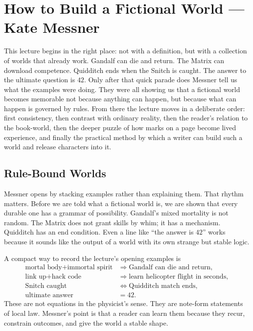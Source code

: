\chapter{How to Build a Fictional World --- Kate Messner}

This lecture begins in the right place: not with a definition, but with a collection of worlds that already work. Gandalf can die and return. The Matrix can download competence. Quidditch ends when the Snitch is caught. The answer to the ultimate question is \(42\). Only after that quick parade does Messner tell us what the examples were doing. They were all showing us that a fictional world becomes memorable not because anything can happen, but because what can happen is governed by rules. From there the lecture moves in a deliberate order: first consistency, then contrast with ordinary reality, then the reader's relation to the book-world, then the deeper puzzle of how marks on a page become lived experience, and finally the practical method by which a writer can build such a world and release characters into it.

\section{Rule-Bound Worlds}

Messner opens by stacking examples rather than explaining them. That rhythm matters. Before we are told what a fictional world is, we are shown that every durable one has a grammar of possibility. Gandalf's mixed mortality is not random. The Matrix does not grant skills by whim; it has a mechanism. Quidditch has an end condition. Even a line like ``the answer is \(42\)'' works because it sounds like the output of a world with its own strange but stable logic.

A compact way to record the lecture's opening examples is
\begin{align}
\text{mortal body} + \text{immortal spirit} &\Rightarrow \text{Gandalf can die and return},\\
\text{link up} + \text{hack code} &\Rightarrow \text{learn helicopter flight in seconds},\\
\text{Snitch caught} &\iff \text{Quidditch match ends},\\
\text{ultimate answer} &= 42.
\end{align}
These are not equations in the physicist's sense. They are note-form statements of local law. Messner's point is that a reader can learn them because they recur, constrain outcomes, and give the world a stable shape.


